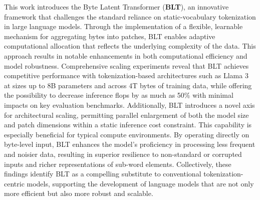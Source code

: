 This work introduces the Byte Latent Transformer (\textbf{BLT}), an innovative framework that challenges the standard reliance on static-vocabulary tokenization in large language models. Through the implementation of a flexible, learnable mechanism for aggregating bytes into patches, {\textsc BLT} enables adaptive computational allocation that reflects the underlying complexity of the data. This approach results in notable enhancements in both computational efficiency and model robustness. Comprehensive scaling experiments reveal that {\textsc BLT} achieves competitive performance with tokenization-based architectures such as Llama 3 at sizes up to 8B parameters and across 4T bytes of training data, while offering the possibility to decrease inference flops by as much as 50\% with minimal impacts on key evaluation benchmarks. Additionally, {\textsc BLT} introduces a novel axis for architectural scaling, permitting parallel enlargement of both the model size and patch dimensions within a static inference cost constraint. This capability is especially beneficial for typical compute environments. By operating directly on byte-level input, {\textsc BLT} enhances the model’s proficiency in processing less frequent and noisier data, resulting in superior resilience to non-standard or corrupted inputs and richer representations of sub-word elements. Collectively, these findings identify {\textsc BLT} as a compelling substitute to conventional tokenization-centric models, supporting the development of language models that are not only more efficient but also more robust and scalable.

